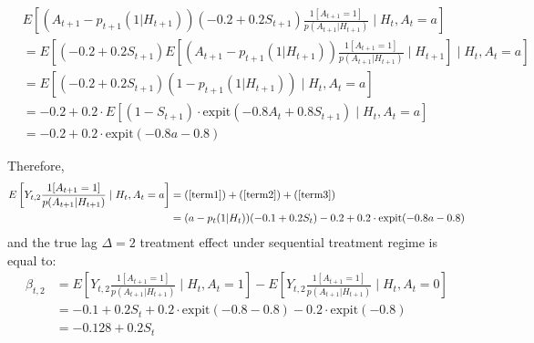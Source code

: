\documentclass[supplementary, lineno]{biometrika}
\begin{document}
\begin{align}
\label{term3}
    & E \left[ (A_{t+1} - p_{t+1}(1 | H_{t+1})) (-0.2 + 0.2 S_{t+1} ) \frac{1[A_{t+1} = 1]}{p (A_{t+1} | H_{t+1} ) } \mid H_{t}, A_{t} = a \right] \nonumber \\
    & = E \left[ (-0.2 + 0.2 S_{t+1} ) E \left[ (A_{t+1} - p_{t+1}(1 | H_{t+1})) \frac{1[A_{t+1} = 1]}{p (A_{t+1} | H_{t+1} ) } \mid H_{t+1} \right] \mid H_{t}, A_{t} = a \right] \nonumber \\
    & = E \left[ (-0.2 + 0.2 S_{t+1}) (1- p_{t+1} (1 |H_{t+1}) ) \mid H_t, A_t = a \right] \nonumber \\
    &=-0.2 + 0.2 \cdot E[(1- S_{t+1}) \cdot  \text{expit}(-0.8 A_{t}+0.8 S_{t+1}) \mid H_t, A_t = a] \nonumber \\
    & = -0.2 + 0.2 \cdot \text{expit}(-0.8a-0.8)
\end{align}

Therefore,
\begin{align*}
    E \left[ Y_{t,2} \frac{1[A_{t+1} = 1]}{p (A_{t+1} | H_{t+1} ) } \mid H_{t}, A_{t} = a \right] & = \text{(\ref{term1})} + \text{(\ref{term2})} + \text{(\ref{term3})} \\
    & = (a - p_t(1| H_t)) (-0.1 + 0.2 S_{t})-0.2 + 0.2 \cdot \text{expit}(-0.8a-0.8)
\end{align*}
and the true lag $\Delta=2$ treatment effect under sequential treatment regime is equal to:
\begin{align}
    \beta_{t,2}&= E \left[ Y_{t,2} \frac{1[A_{t+1} = 1]}{p (A_{t+1} | H_{t+1} ) } \mid H_{t}, A_{t} = 1 \right]  -  E \left[ Y_{t,2} \frac{1[A_{t+1} = 1]}{p (A_{t+1} | H_{t+1} ) } \mid H_{t}, A_{t} = 0 \right] \nonumber \\
    & =-0.1 + 0.2S_t + 0.2 \cdot \text{expit}(-0.8-0.8)- 0.2 \cdot \text{expit}(-0.8) \nonumber \\
    & = -0.128 +0.2S_t
\end{align}
\end{document}

